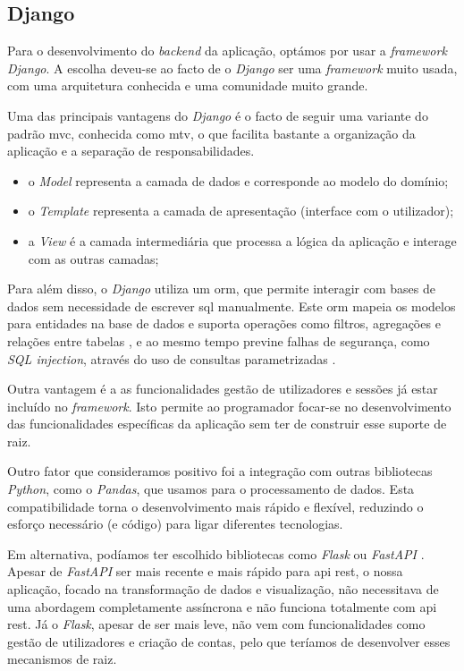\subsection{Django}

Para o desenvolvimento do \textit{backend} da aplicação, optámos por usar a \textit{framework} \textit{Django}. A escolha deveu-se ao facto de o \textit{Django} ser uma \textit{framework} muito usada, com uma arquitetura conhecida e uma comunidade muito grande.

Uma das principais vantagens do \textit{Django}\cite{djangodocs} é o facto de seguir uma variante do padrão \gls{mvc}, conhecida como \gls{mtv},  o que facilita bastante a organização da aplicação e a separação de responsabilidades.

\begin{itemize}
    \item o \textit{Model} representa a camada de dados e corresponde ao modelo do domínio;

    \item o \textit{Template} representa a camada de apresentação (interface com o utilizador);

    \item a \textit{View} é a camada intermediária que processa a lógica da aplicação e interage com as outras camadas;
\end{itemize}

Para além disso, o \textit{Django} utiliza um \gls{orm}, que permite interagir com bases de dados sem necessidade de escrever \gls{sql} manualmente. Este \gls{orm} mapeia os modelos para entidades na base de dados e suporta operações como filtros, agregações e relações entre tabelas \cite{djangodocs}, e ao mesmo tempo previne falhas de segurança, como \textit{SQL injection}, através do uso de consultas parametrizadas \cite{kumar2016security}.

Outra vantagem é a as funcionalidades gestão de utilizadores e sessões já estar incluído no \textit{framework}. Isto permite ao programador focar-se no desenvolvimento das funcionalidades específicas da aplicação sem ter de construir esse suporte de raiz.

Outro fator que consideramos positivo foi a integração com outras bibliotecas \textit{Python}, como o \textit{Pandas}, que usamos para o processamento de dados. Esta compatibilidade torna o desenvolvimento mais rápido e flexível, reduzindo o esforço necessário (e código) para ligar diferentes tecnologias.

Em alternativa, podíamos ter escolhido bibliotecas como \textit{Flask} \cite{grinberg2018flask} ou \textit{FastAPI} \cite{tiangolo2018fastapi}. Apesar de \textit{FastAPI} ser mais recente e mais rápido para \gls{api} \gls{rest}, o nossa aplicação, focado na transformação de dados e visualização, não necessitava de uma abordagem completamente assíncrona e não funciona totalmente com \gls{api} \gls{rest}. Já o \textit{Flask}, apesar de ser mais leve, não vem com funcionalidades como gestão de utilizadores e criação de contas, pelo que teríamos de desenvolver esses mecanismos de raiz.

